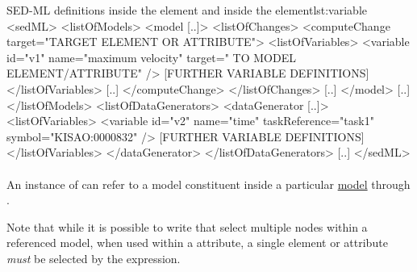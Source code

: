 \begin{myXmlLst}{SED-ML  definitions inside the  element and inside the  element}{lst:variable}
<sedML>
	<listOfModels>
		<model [..]>
			<listOfChanges>
				<computeChange target="TARGET ELEMENT OR ATTRIBUTE">
				<listOfVariables>
				   <variable id="v1" name="maximum velocity" target=" TO MODEL ELEMENT/ATTRIBUTE" />
				   [FURTHER VARIABLE DEFINITIONS]
				</listOfVariables>
				[..]
				</computeChange>
			</listOfChanges>
			[..]
		</model>
		[..]
	</listOfModels>
	<listOfDataGenerators>
		<dataGenerator [..]>
			<listOfVariables>
				<variable id="v2" name="time" taskReference="task1" symbol="KISAO:0000832" />
				[FURTHER VARIABLE DEFINITIONS]
			</listOfVariables>
		</dataGenerator>
	</listOfDataGenerators>
	[..]
</sedML>
\end{myXmlLst}


\paragraph*{}
\label{sec:target}
An instance of \Variable can refer to a model constituent inside a particular \hyperref[class:model]{model} through . 

Note that while it is possible to write  that select multiple nodes within a referenced model, when used within a  attribute, a single element or attribute \emph{must} be selected by the expression.

